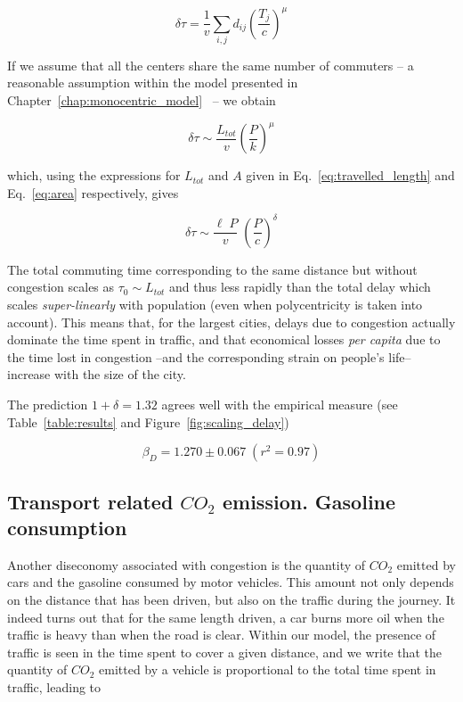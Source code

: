 \begin{equation} 
    \delta \tau = \frac{1}{v} \sum_{i,j} d_{ij} \left(\frac{T_j}{c} \right)^\mu 
\end{equation}

If we assume that all the centers share the same number of commuters -- a
reasonable assumption within the model presented in
Chapter~\ref{chap:monocentric_model}~\cite{Louf:2013_polycentric} -- we obtain

\begin{equation} 
    \delta \tau \sim \frac{L_{tot}}{v} \left( \frac{P}{k}
\right)^{\mu} 
\end{equation} 

which, using the expressions for $L_{tot}$ and $A$
given in Eq.~\ref{eq:travelled_length} and Eq.~\ref{eq:area} respectively, gives

\begin{equation} 
    \delta \tau \sim \frac{\ell\; P}{v}\;\left(\frac{P}{c}\right)^{\delta} 
\end{equation}

The total commuting time corresponding to the same distance but without
congestion scales as $\tau_0\sim L_{tot}$ and thus less rapidly than the total
delay which scales \emph{super-linearly} with population (even when
polycentricity is taken into account). This means that, for the largest cities,
delays due to congestion actually dominate the time spent in traffic, and that
economical losses \emph{per capita} due to the time lost in congestion --and the
corresponding strain on people's life-- increase with the size of the city. 

The prediction $1+\delta = 1.32$ agrees well with the empirical measure (see
Table~\ref{table:results} and Figure~\ref{fig:scaling_delay})

\begin{equation}
    \boxed{\beta_D = 1.270 \pm 0.067\;(r^2 = 0.97)}
\end{equation}

\subsection{Transport related $CO_2$ emission. Gasoline consumption}

Another diseconomy associated with congestion is the quantity of $CO_2$ emitted
by cars and the gasoline consumed by motor vehicles. This amount not only
depends on the distance that has been driven, but also on the traffic during the
journey. It indeed turns out that for the same length driven, a car burns more
oil when the traffic is heavy than when the road is clear.  Within our model,
the presence of traffic is seen in the time spent to cover a given distance, and
we write that the quantity of $CO_2$ emitted by a vehicle is proportional to the
total time spent in traffic, leading to

